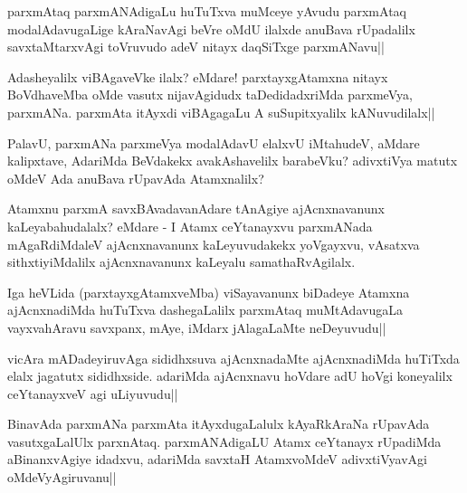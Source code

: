 
\begin{artha}
parxmAtaq parxmANAdigaLu huTuTxva muMceye yAvudu parxmAtaq modalAdavugaLige kAraNavAgi beVre oMdU ilalxde anuBava rUpadalilx savxtaMtarxvAgi toVruvudo adeV nitayx daqSiTxge parxmANavu||
\end{artha}

\begin{artha}
Adasheyalilx viBAgaveVke ilalx? eMdare! parxtayxgAtamxna nitayx BoVdhaveMba oMde vasutx nijavAgidudx taDedidadxriMda parxmeVya, parxmANa. parxmAta itAyxdi viBAgagaLu A suSupitxyalilx kANuvudilalx||
\end{artha}

\begin{artha}
PalavU, parxmANa parxmeVya modalAdavU elalxvU iMtahudeV, aMdare kalipxtave, AdariMda BeVdakekx avakAshavelilx barabeVku? adivxtiVya matutx oMdeV Ada anuBava rUpavAda Atamxnalilx? 
\end{artha}

\begin{artha}
Atamxnu parxmA savxBAvadavanAdare tAnAgiye ajAcnxnavanunx kaLeyabahudalalx? eMdare - I Atamx ceYtanayxvu parxmANada mAgaRdiMdaleV ajAcnxnavanunx kaLeyuvudakekx yoVgayxvu, vAsatxva sithxtiyiMdalilx ajAcnxnavanunx kaLeyalu samathaRvAgilalx.
\end{artha}

\begin{artha}%
Iga heVLida (parxtayxgAtamxveMba) viSayavanunx biDadeye Atamxna ajAcnxnadiMda huTuTxva dashegaLalilx parxmAtaq muMtAdavugaLa vayxvahAravu savxpanx, mAye, iMdarx jAlagaLaMte neDeyuvudu||
\end{artha}

\begin{artha}
vicAra mADadeyiruvAga sididhxsuva ajAcnxnadaMte ajAcnxnadiMda huTiTxda elalx jagatutx sididhxside. adariMda ajAcnxnavu hoVdare adU hoVgi koneyalilx ceYtanayxveV agi uLiyuvudu||
\end{artha}

\begin{artha}
BinavAda parxmANa parxmAta itAyxdugaLalulx kAyaRkAraNa rUpavAda vasutxgaLalUlx parxnAtaq. parxmANAdigaLU Atamx ceYtanayx rUpadiMda aBinanxvAgiye idadxvu, adariMda savxtaH AtamxvoMdeV adivxtiVyavAgi oMdeVyAgiruvanu||
\end{artha}


